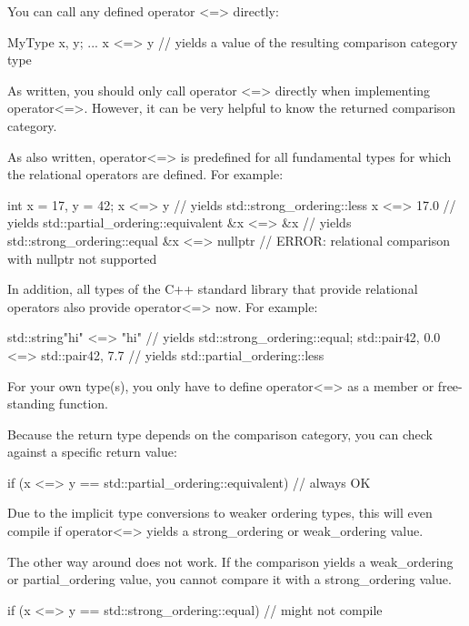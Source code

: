 You can call any defined operator <=> directly:

\begin{cpp}
MyType x, y;
...
x <=> y // yields a value of the resulting comparison category type
\end{cpp}

As written, you should only call operator <=> directly when implementing operator<=>. However, it can be very helpful to know the returned comparison category.

As also written, operator<=> is predefined for all fundamental types for which the relational operators are defined. For example:

\begin{cpp}
int x = 17, y = 42;
x <=> y // yields std::strong_ordering::less
x <=> 17.0 // yields std::partial_ordering::equivalent
&x <=> &x // yields std::strong_ordering::equal
&x <=> nullptr // ERROR: relational comparison with nullptr not supported
\end{cpp}

In addition, all types of the C++ standard library that provide relational operators also provide operator<=> now. For example:

\begin{cpp}
std::string{"hi"} <=> "hi" // yields std::strong_ordering::equal;
std::pair{42, 0.0} <=> std::pair{42, 7.7} // yields std::partial_ordering::less
\end{cpp}

For your own type(s), you only have to define operator<=> as a member or free-standing function.

Because the return type depends on the comparison category, you can check against a specific return value:

\begin{cpp}
if (x <=> y == std::partial_ordering::equivalent) // always OK
\end{cpp}

Due to the implicit type conversions to weaker ordering types, this will even compile if operator<=> yields a strong\_ordering or weak\_ordering value.

The other way around does not work. If the comparison yields a weak\_ordering or partial\_ordering value, you cannot compare it with a strong\_ordering value.

\begin{cpp}
if (x <=> y == std::strong_ordering::equal) // might not compile
\end{cpp}

